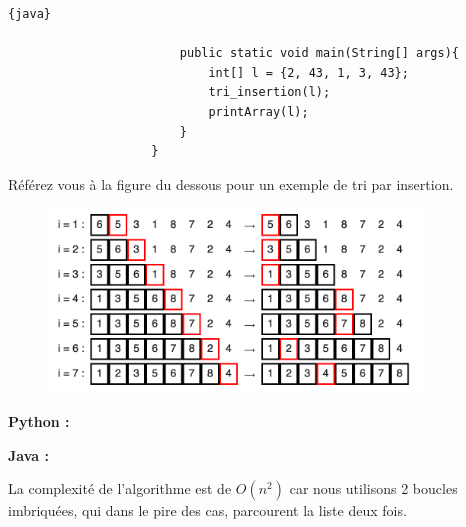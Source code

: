 \begin{Exercice} [20 minutes]
\begin{itemize}
\begin{lstlisting}{java}
                        
                        public static void main(String[] args){
                            int[] l = {2, 43, 1, 3, 43};
                            tri_insertion(l);
                            printArray(l);
                        }
                    }
                \end{lstlisting}
    \end{itemize}
    
    \begin{conseil}
        Référez vous à la figure du dessous pour un exemple de tri par insertion.
    \end{conseil}
    
    \begin{figure}[h!]
        \centering
        \includegraphics[width=10cm]{ressources/tri_insertion.png}
    \end{figure}

    \begin{solution}
        \textbf{Python :}
             
        \textbf{Java :}
            
    
    La complexité de l'algorithme est de $O(n^2)$ car nous utilisons 2 boucles imbriquées, qui dans le pire des cas, parcourent la liste deux fois.
    \end{solution}
    
\end{Exercice}

